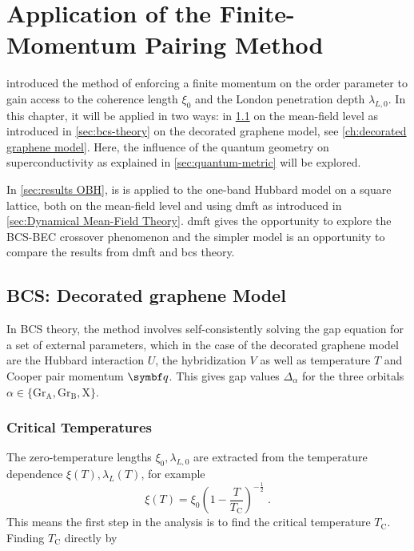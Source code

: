 \documentclass[../notes.tex]{subfiles}
\begin{document}
	
\chapter{Application of the Finite-Momentum Pairing Method}\label{ch:results}

 introduced the method of enforcing a finite momentum on the order parameter to gain access to the coherence length \(\xi_0\) and the London penetration depth \(\lambda_{L, 0}\).
In this chapter, it will be applied in two ways: in \cref{sec:results decorated graphene model} on the mean-field level as introduced in \cref{sec:bcs-theory} on the decorated graphene model, see \cref{ch:decorated graphene model}.
Here, the influence of the quantum geometry on superconductivity as explained in \cref{sec:quantum-metric} will be explored.

In \cref{sec:results OBH}, is is applied to the one-band Hubbard model on a square lattice, both on the mean-field level and using \gls{dmft} as introduced in \cref{sec:Dynamical Mean-Field Theory}.
\gls{dmft} gives the opportunity to explore the BCS-BEC crossover phenomenon and the simpler model is an opportunity to compare the results from \gls{dmft} and \gls{bcs} theory. 

\section{BCS: Decorated graphene Model}\label{sec:results decorated graphene model}

In BCS theory, the method involves self-consistently solving the gap equation for a set of external parameters, which in the case of the decorated graphene model are the Hubbard interaction \(U\), the hybridization \(V\) as well as temperature \(T\) and Cooper pair momentum \(\vb{q}\).
This gives gap values \(\Delta_{\alpha}\) for the three orbitals \(\alpha \in \{\mathrm{Gr}_{\mathrm{A}}, \mathrm{Gr}_{\mathrm{B}}, \mathrm{X}\}\).

\subsection*{Critical Temperatures}

The zero-temperature lengths \(\xi_0, \lambda_{L,0}\) are extracted from the temperature dependence \(\xi (T), \lambda_L (T)\), for example
\begin{equation}
	\xi(T) = \xi_0 \left(1 - \frac{T}{T_{\mathrm{C}}}\right)^{-\frac{1}{2}}\;.
\end{equation}
This means the first step in the analysis is to find the critical temperature \(T_{\mathrm{C}}\).
Finding \(T_{\mathrm{C}}\) directly by 
\end{document}
